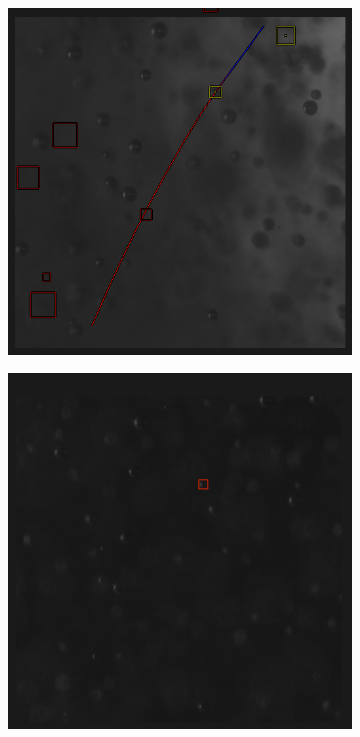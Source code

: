 \begin{figure}
\begin{subfigure}[t]{.4\textwidth}
					\includegraphics[scale=0.45]{images/tracking_green_2.png}
					\caption{}
					\label{subfig:green_2}
				\end{subfigure}

				\begin{subfigure}[t]{.55\textwidth}
					\centering
					\includegraphics[scale=0.45]{images/tracking_red.png}
					\caption{}
					\label{subfig:red}
				\end{subfigure}
								

\end{figure}
